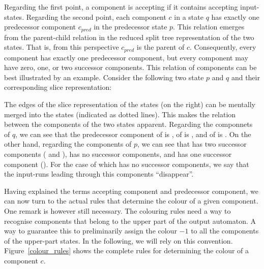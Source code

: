 Regarding the first point, a component is accepting if it contains accepting input-states. Regarding the second point, each component $c$ in a state $q$ has exactly one predecessor component $c_{pred}$ in the predecessor state $p$. This relation emerges from the parent-child relation in the reduced split tree representation of the two states. That is, from this perspective $c_{pred}$ is the parent of $c$. Consequently, every component has exactly one predecessor component, but every component may have zero, one, or two successor components. This relation of components can be best illustrated by an example. Consider the following two state $p$ and $q$ and their corresponding slice representation:

\begin{center}
\PredCompsFirst
\end{center}

The edges of the slice representation of the states (on the right) can be mentally merged into the states (indicated as dotted lines). This makes the relation between the components of the two states apparent. Regarding the componnets of $q$, we can see that the predecessor component of   is , of  is , and of  is . On the other hand, regarding the components of $p$, we can see that  has two successor components ( and ),  has no successor components, and  has one successor component (). For the case of  which has no successor components, we say that the input-runs leading through this components ``disappear''.

Having explained the terms accepting component and predecessor component, we can now turn to the actual rules that determine the colour of a given component. One remark is however still necessary. The colouring rules need a way to recognise components that belong to the upper part of the output automaton. A way to guarantee this to preliminarily assign the colour $-1$ to all the components of the upper-part states. In the following, we will rely on this convention. Figure~\ref{colour_rules} shows the complete rules for determining the colour of a component $c$.

